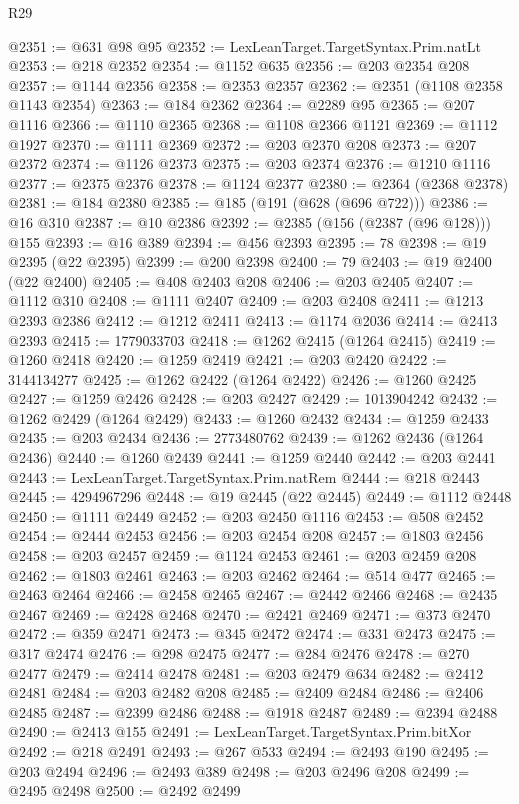 \begin{lexlean}{R29}
\begin{coremodule}
@2351 := @631 @98 @95
@2352 := LexLeanTarget.TargetSyntax.Prim.natLt
@2353 := @218 @2352
@2354 := @1152 @635
@2356 := @203 @2354 @208
@2357 := @1144 @2356
@2358 := @2353 @2357
@2362 := @2351 (@1108 @2358 @1143 @2354)
@2363 := @184 @2362
@2364 := @2289 @95
@2365 := @207 @1116
@2366 := @1110 @2365
@2368 := @1108 @2366 @1121
@2369 := @1112 @1927
@2370 := @1111 @2369
@2372 := @203 @2370 @208
@2373 := @207 @2372
@2374 := @1126 @2373
@2375 := @203 @2374
@2376 := @1210 @1116
@2377 := @2375 @2376
@2378 := @1124 @2377
@2380 := @2364 (@2368 @2378)
@2381 := @184 @2380
@2385 := @185 (@191 (@628 (@696 @722)))
@2386 := @16 @310
@2387 := @10 @2386
@2392 := @2385 (@156 (@2387 (@96 @128))) @155
@2393 := @16 @389
@2394 := @456 @2393
@2395 := 78
@2398 := @19 @2395 (@22 @2395)
@2399 := @200 @2398
@2400 := 79
@2403 := @19 @2400 (@22 @2400)
@2405 := @408 @2403 @208
@2406 := @203 @2405
@2407 := @1112 @310
@2408 := @1111 @2407
@2409 := @203 @2408
@2411 := @1213 @2393 @2386
@2412 := @1212 @2411
@2413 := @1174 @2036
@2414 := @2413 @2393
@2415 := 1779033703
@2418 := @1262 @2415 (@1264 @2415)
@2419 := @1260 @2418
@2420 := @1259 @2419
@2421 := @203 @2420
@2422 := 3144134277
@2425 := @1262 @2422 (@1264 @2422)
@2426 := @1260 @2425
@2427 := @1259 @2426
@2428 := @203 @2427
@2429 := 1013904242
@2432 := @1262 @2429 (@1264 @2429)
@2433 := @1260 @2432
@2434 := @1259 @2433
@2435 := @203 @2434
@2436 := 2773480762
@2439 := @1262 @2436 (@1264 @2436)
@2440 := @1260 @2439
@2441 := @1259 @2440
@2442 := @203 @2441
@2443 := LexLeanTarget.TargetSyntax.Prim.natRem
@2444 := @218 @2443
@2445 := 4294967296
@2448 := @19 @2445 (@22 @2445)
@2449 := @1112 @2448
@2450 := @1111 @2449
@2452 := @203 @2450 @1116
@2453 := @508 @2452
@2454 := @2444 @2453
@2456 := @203 @2454 @208
@2457 := @1803 @2456
@2458 := @203 @2457
@2459 := @1124 @2453
@2461 := @203 @2459 @208
@2462 := @1803 @2461
@2463 := @203 @2462
@2464 := @514 @477
@2465 := @2463 @2464
@2466 := @2458 @2465
@2467 := @2442 @2466
@2468 := @2435 @2467
@2469 := @2428 @2468
@2470 := @2421 @2469
@2471 := @373 @2470
@2472 := @359 @2471
@2473 := @345 @2472
@2474 := @331 @2473
@2475 := @317 @2474
@2476 := @298 @2475
@2477 := @284 @2476
@2478 := @270 @2477
@2479 := @2414 @2478
@2481 := @203 @2479 @634
@2482 := @2412 @2481
@2484 := @203 @2482 @208
@2485 := @2409 @2484
@2486 := @2406 @2485
@2487 := @2399 @2486
@2488 := @1918 @2487
@2489 := @2394 @2488
@2490 := @2413 @155
@2491 := LexLeanTarget.TargetSyntax.Prim.bitXor
@2492 := @218 @2491
@2493 := @267 @533
@2494 := @2493 @190
@2495 := @203 @2494
@2496 := @2493 @389
@2498 := @203 @2496 @208
@2499 := @2495 @2498
@2500 := @2492 @2499

\end{coremodule}
\end{lexlean}
